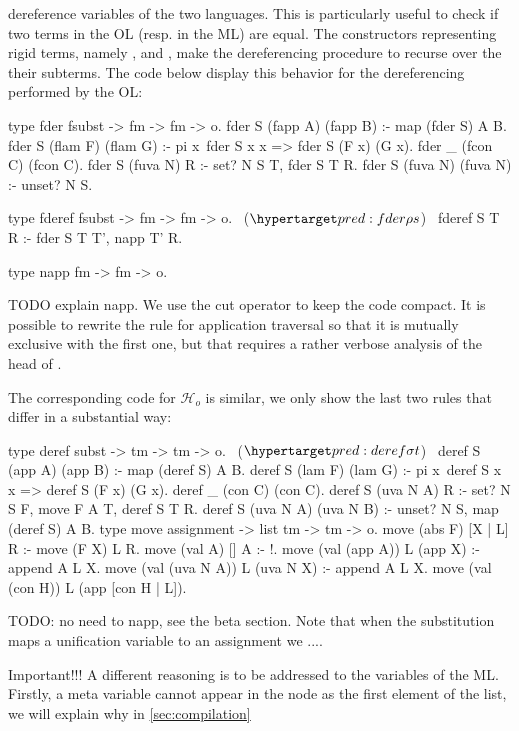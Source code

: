 \documentclass[sigconf,natbib=false]{acmart}
\newcommand{\Ho}{\ensuremath{\mathcal{H}_o}\xspace}
\begin{document}
dereference variables of the two languages. This is particularly useful to check
if two terms in the OL (resp. in the ML) are equal. The constructors
representing rigid terms, namely ,  and ,
make the dereferencing procedure to recurse over the their subterms. The code
below display this behavior for the dereferencing performed by the OL:

\begin{elpicode}
type fder fsubst -> fm -> fm -> o.
fder S (fapp A) (fapp B) :- map (fder S) A B.
fder S (flam F) (flam G) :- 
  pi x\ fder S x x => fder S (F x) (G x).
fder _ (fcon C) (fcon C).
fder S (fuva N) R :- set? N S T, fder S T R.
fder S (fuva N) (fuva N) :- unset? N S.

type fderef fsubst -> fm -> fm -> o.                 ~($\customlabel{pred:fder}{\rho s}$)~
fderef S T R :- fder S T T', napp T' R.

type napp fm -> fm -> o.
\end{elpicode}

\noindent
TODO explain napp.
We use the cut operator to keep the code compact. It is possible to rewrite
the rule for application traversal so that it is mutually exclusive with the
first one, but that requires a rather verbose analysis of the head of .

The corresponding code for \Ho is similar, we only show the last two rules that
differ in a substantial way:

\begin{elpicode}
type deref subst -> tm -> tm -> o.                   ~($\customlabel{pred:deref}{\sigma t}$)~
deref S (app A) (app B) :- map (deref S) A B.
deref S (lam F) (lam G) :- 
  pi x\ deref S x x => deref S (F x) (G x).
deref _ (con C) (con C).
deref S (uva N A) R :- set? N S F, move F A T, deref S T R.
deref S (uva N A) (uva N B) :- unset? N S, map (deref S) A B.
type move assignment -> list tm -> tm -> o.
move (abs F) [X | L] R :- move (F X) L R.
move (val A)         [] A :- !.
move (val (app A))   L (app X) :- append A L X.
move (val (uva N A)) L (uva N X) :- append A L X.
move (val (con H))   L (app [con H | L]).
\end{elpicode}

\noindent
TODO: no need to napp, see the beta section.
Note that when the substitution  maps a unification variable
 to an assignment  we ....

Important!!!
A different reasoning is to be addressed to the variables of the ML. Firstly, a
meta variable cannot appear in the  node as the first element of the
list, we will explain why in \cref{sec:compilation}
\end{document}
